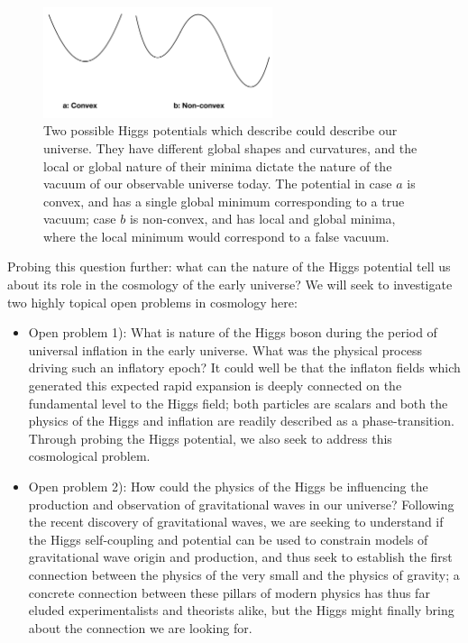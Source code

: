\documentclass[10pt,oneside,notitlepage,abstracton,a4paper]{scrartcl}
\begin{document}
\begin{figure}[!ht]
\centering
\includegraphics[width=0.6\textwidth]{Figures/HiggsPotentials.png}
\caption{Two possible Higgs potentials which describe could describe our universe. They have different global shapes and curvatures, and the local or global nature of their minima dictate the nature of the vacuum of our observable universe today. The potential in case $a$ is convex, and has a single global minimum corresponding to a true vacuum; case $b$ is non-convex, and has local and global minima, where the local minimum would correspond to a false vacuum.}
\label{fig:HiggsPotentials}
\end{figure}

Probing this question further: what can the nature of the Higgs potential tell us about its role in the cosmology of the early universe? We will seek to investigate two highly topical open problems in cosmology here: \\

\begin{itemize}
\item Open problem 1): What is nature of the Higgs boson during the period of universal inflation in the early universe. What was the physical process driving such an inflatory epoch? It could well be that the inflaton fields which generated this expected rapid expansion is deeply connected on the fundamental level to the Higgs field; both particles are scalars and both the physics of the Higgs and inflation are readily described as a phase-transition. Through probing the Higgs potential, we also seek to address this cosmological problem. \\
\item Open problem 2): How could the physics of the Higgs be influencing the production and observation of gravitational waves in our universe? Following the recent discovery of gravitational waves, we are seeking to understand if the Higgs self-coupling and potential can be used to constrain models of gravitational wave origin and production, and thus seek to establish the first connection between the physics of the very small and the physics of gravity; a concrete connection between these pillars of modern physics has thus far eluded experimentalists and theorists alike, but the Higgs might finally bring about the connection we are looking for. \\
\end{itemize}
\end{document}
